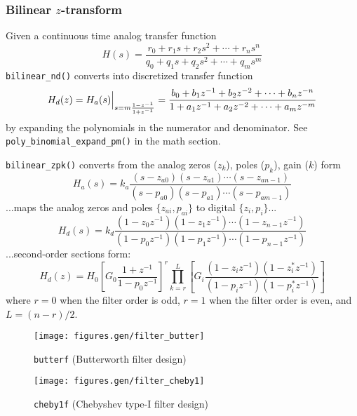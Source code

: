 \subsubsection{Bilinear $z$-transform}
Given a continuous time analog transfer function
\[
    H(s) =  \frac{
                r_0 + r_1 s + r_2 s^2 + \cdots + r_n s^n
            }{
                q_0 + q_1 s + q_2 s^2 + \cdots + q_m s^m
            }
\]
{\tt bilinear\_nd()} converts into discretized transfer function
\[
    H_d(z) = H_a(s)\Bigl.\Bigr|_{s = m\frac{1-z^{-1}}{1+z^{-1}}}
           =    \frac{
                    b_0 + b_1 z^{-1} + b_2 z^{-2} + \cdots + b_n z^{-n}
                }{
                    1   + a_1 z^{-1} + a_2 z^{-2} + \cdots + a_m z^{-m}
                }
\]
by expanding the polynomials in the numerator and denominator.
See {\tt poly\_binomial\_expand\_pm()} in the math section.

{\tt bilinear\_zpk()} converts from the analog zeros ($z_k$), poles ($p_k$),
gain ($k$) form
\[
    H_a(s) = k_a
            \frac{
                (s-z_{a0})(s-z_{a1})\cdots(s-z_{an-1})
            }{
                (s-p_{a0})(s-p_{a1})\cdots(s-p_{am-1})
            }
\]
...maps the analog zeros and poles $\{z_{ai},p_{ai}\}$
to digital $\{z_{i},p_{i}\}$...
\[
    H_d(s) = k_d
            \frac{
                (1-z_{0}z^{-1})(1-z_{1}z^{-1})\cdots(1-z_{n-1}z^{-1})
            }{
                (1-p_{0}z^{-1})(1-p_{1}z^{-1})\cdots(1-p_{n-1}z^{-1})
            }
\]
...second-order sections form:
\[
    H_d(z) = H_0
             \left[
                G_0 \frac{1 + z^{-1}}
                         {1 - p_0 z^{-1}}
             \right]^r
             \prod_{k=r}^{L} {\left[
                G_i \frac{(1-z_iz^{-1})(1-z_i^*z^{-1})}
                         {(1-p_iz^{-1})(1-p_i^*z^{-1})}
             \right]}
\]
where $r=0$ when the filter order is odd, $r=1$ when the filter order is even,
and $L=(n-r)/2$.

\begin{figure}
\centering
\texttt{[image: figures.gen/filter\_butter]}
\caption{{\tt butterf} (Butterworth filter design)}
\label{fig:module:filter:butter}
\end{figure}

\begin{figure}
\centering
\texttt{[image: figures.gen/filter\_cheby1]}
\caption{{\tt cheby1f} (Chebyshev type-I filter design)}
\label{fig:module:filter:cheby1}
\end{figure}

